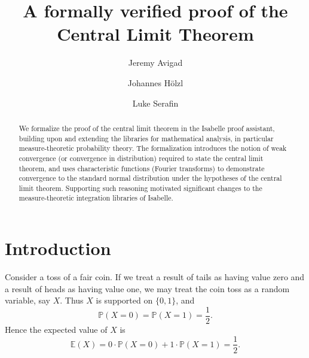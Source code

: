 \documentclass{svjour3}
\begin{document}
\title{A formally verified proof of the Central Limit Theorem}


\author{Jeremy Avigad \and Johannes H\"olzl \and Luke Serafin}



\maketitle


\begin{abstract}
We formalize the proof of the central limit theorem in the Isabelle proof assistant, building upon and extending the libraries for mathematical analysis, in particular measure-theoretic probability theory. The formalization introduces the notion of weak convergence (or convergence in distribution) required to state the central limit theorem, and uses characteristic functions (Fourier transforms) to demonstrate convergence to the standard normal distribution under the hypotheses of the central limit theorem. Supporting such reasoning motivated significant changes to the measure-theoretic integration libraries of Isabelle.
\end{abstract}


\section{Introduction}
\label{section:introduction}

Consider a toss of a fair coin. If we treat a result of tails as having value zero and a result of heads as having value one, we may treat the coin toss as a random variable, say $X$. Thus $X$ is supported on $\{0,1\}$, and
\[ \mathbb P(X = 0) = \mathbb P(X = 1) = \frac{1}{2}. \]
Hence the expected value of $X$ is
\[ \mathbb E(X) = 0 \cdot \mathbb P(X = 0) + 1 \cdot \mathbb P(X = 1) = \frac{1}{2}. \]
\end{document}
